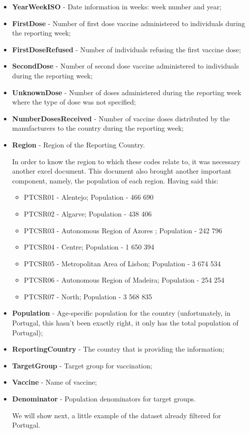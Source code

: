 \begin{itemize}
    \item \textbf{YearWeekISO} - Date information in weeks:  week number and year;
    \item \textbf{FirstDose} - Number of first dose vaccine administered to individuals during the reporting week;
    \item \textbf{FirstDoseRefused} - Number of individuals refusing the first vaccine dose;
    \item \textbf{SecondDose} - Number of second dose vaccine administered to individuals during the reporting week;
    \item \textbf{UnknownDose} - Number of doses administered during the reporting week where the type of dose was not specified;
    \item \textbf{NumberDosesReceived} - Number of vaccine doses distributed by the manufacturers to the country during the reporting week;
    \item \textbf{Region} -  Region of the Reporting Country.
   
    In order to know the region to which these codes relate to, it was necessary another excel document. This document also brought another important component, namely, the population of each region. Having said this:
    \begin{itemize}
        \item PTCSR01 - Alentejo; Population - 466 690
        \item PTCSR02 - Algarve; Population - 438 406
        \item PTCSR03 - Autonomous Region of Azores ; Population - 242 796
        \item PTCSR04 - Centre; Population - 1 650 394
        \item PTCSR05 - Metropolitan Area of Lisbon; Population - 3 674 534
        \item PTCSR06 - Autonomous Region of Madeira; Population - 254 254
        \item PTCSR07 - North; Population - 3 568 835

    \end{itemize}
    \item \textbf{Population} - Age-specific population for the country (unfortunately, in Portugal, this hasn't been exactly right, it only has the total population of Portugal);
    \item \textbf{ReportingCountry} - The country that is providing the information;
    \item \textbf{TargetGroup} - Target group for vaccination;
    \item \textbf{Vaccine} - Name of vaccine;
    \item \textbf{Denominator} - Population denominators for target groups.

We will show next, a little example of the dataset already filtered for Portugal.

\end{itemize}

